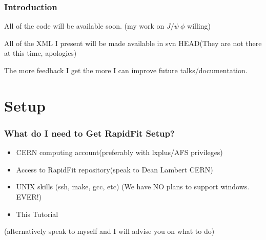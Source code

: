 \documentclass{beamer}
\begin{document}
\begin{frame}
\frametitle{Introduction}
All of the code will be available soon. (my work on $J/\psi~\phi$ willing)\newline

All of the XML I present will be made available in svn HEAD\newline(They are not there at this time, apologies)\newline

The more feedback I get the more I can improve future talks/documentation.

\end{frame}

\section{Setup}

\begin{frame}
 \frametitle{What do I need to Get RapidFit Setup?}
 \begin{itemize}
  \item CERN computing account\newline(preferably with lxplus/AFS privileges)\newline
  \item Access to RapidFit repository\newline(speak to Dean Lambert \@ CERN)\newline
  \item UNIX skills (ssh, make, gcc, etc)\newline
  (We have NO plans to support windows. EVER!)\newline
  \item This Tutorial\newline
  \end{itemize}
  (alternatively speak to myself and I will advise you on what to do)
\end{frame}
\end{document}
